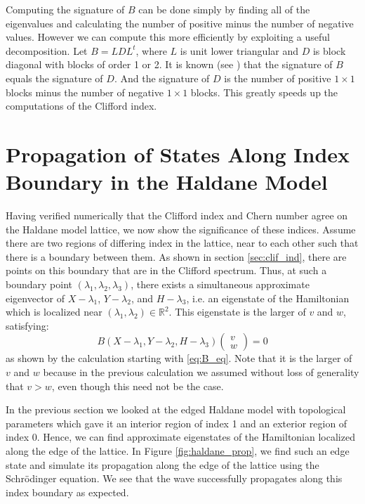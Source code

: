 \documentclass[a4paper]{article}
\begin{document}
Computing the signature of $B$ can be done simply by finding all of the eigenvalues and calculating the number of positive minus the number of negative values.
However we can compute this more efficiently by exploiting a useful decomposition.
Let $B = LDL^t$, where $L$ is unit lower triangular and $D$ is block diagonal with blocks of order 1 or 2.
It is known (see \cite{BunchKaufman}) that the signature of $B$ equals the signature of $D$.
And the signature of $D$ is the number of positive $1 \times 1$ blocks minus the number of negative $1 \times 1$ blocks.
This greatly speeds up the computations of the Clifford index.

\section{Propagation of States Along Index Boundary in the Haldane Model}

Having verified numerically that the Clifford index and Chern number agree on the Haldane model lattice, we now show the significance of these indices.
Assume there are two regions of differing index in the lattice, near to each other such that there is a boundary between them.
As shown in section \ref{sec:clif_ind}, there are points on this boundary that are in the Clifford spectrum.
Thus, at such a boundary point $(\lambda_1,\lambda_2,\lambda_3)$, there exists a simultaneous approximate eigenvector of $X-\lambda_1$, $Y-\lambda_2$, and $H-\lambda_3$, i.e. an eigenstate of the Hamiltonian which is localized near $(\lambda_1,\lambda_2) \in \mathbb{R}^2$.
This eigenstate is the larger of $v$ and $w$, satisfying:
\begin{equation}
B(X-\lambda_1,Y-\lambda_2,H-\lambda_3) \begin{pmatrix}v\\w\end{pmatrix} = 0
\end{equation}
as shown by the calculation starting with \eqref{eq:B_eq}.
Note that it is the larger of $v$ and $w$ because in the previous calculation we assumed without loss of generality that $v > w$, even though this need not be the case.
 
In the previous section we looked at the edged Haldane model with topological parameters which gave it an interior region of index 1 and an exterior region of index 0.
Hence, we can find approximate eigenstates of the Hamiltonian localized along the edge of the lattice.
In Figure \ref{fig:haldane_prop}, we find such an edge state and simulate its propagation along the edge of the lattice using the Schr{\"o}dinger equation.
We see that the wave successfully propagates along this index boundary as expected.
\end{document}
